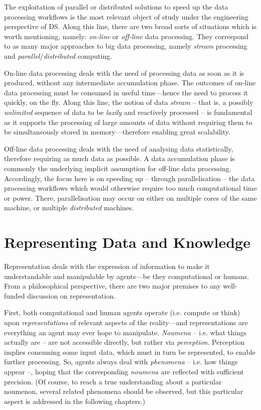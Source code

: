 \documentclass[12pt,a4paper,openright,twoside]{book}
\begin{document}
The exploitation of parallel or distributed solutions to speed up the data processing workflows is the most relevant object of study under the engineering perspective of DS.
%
Along this line, there are two broad sorts of situations which is worth mentioning, namely: \emph{on-line} or \emph{off-line} data processing.
%
They correspond to as many major approaches to big data processing, namely \emph{stream} processing and \emph{parallel}/\emph{distributed} computing.

On-line data processing deals with the need of processing data as soon as it is produced, without any intermediate accumulation phase.
%
The outcomes of on-line data processing must be consumed in useful time---hence the need to process it quickly, on the fly.
%
Along this line, the notion of data \emph{stream} -- that is, a possibly \emph{unlimited} sequence of data to be \emph{lazily} and reactively processed -- is fundamental as it supports the processing of large amounts of data without requiring them to be simultaneously stored in memory---therefore enabling great scalability.

Off-line data processing deals with the need of analysing data statistically, therefore requiring as much data as possible.
%
A data accumulation phase is commonly the underlying implicit assumption for off-line data processing.
%
Accordingly, the focus here is on speeding up -- through parallelisation -- the data processing workflows which would otherwise require too much computational time or power.
%
There, parallelisation may occur on either on multiple cores of the same machine, or multiple \emph{distributed} machines.

\chapter{Representing Data and Knowledge}

Representation deals with the expression of information to make it understandable and manipulable by agents---be they computational or humans.
%
From a philosophical perspective, there are two major premises to any well-funded discussion on representation.

First, both computational and human agents operate (i.e. compute or think) upon \emph{representations} of relevant aspects of the reality---and representations are everything an agent may ever hope to manipulate.
%
\emph{Noumena} -- i.e. what things actually are -- are not accessible directly, but rather via \emph{perception}.
%
Perception implies consuming some input data, which must in turn be represented, to enable further processing.
%
So, agents always deal with \emph{phenomena} -- i.e. how things appear --, hoping that the corresponding \emph{noumena} are reflected with sufficient precision.
%
(Of course, to reach a true understanding about a particular noumenon, several related phenomena should be observed, but this particular aspect is addressed in the following chapters.)
%
\end{document}
